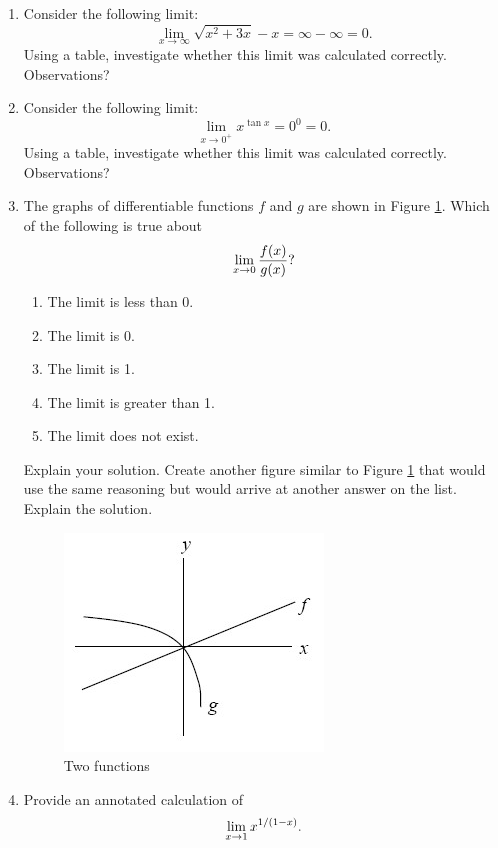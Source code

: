 \begin{enumerate}
\item  Consider the following limit:  $$\mathop {\lim }\limits_{x \to \infty } \sqrt {x^2  + 3x}  - x = \infty  - \infty  = 0.$$  Using a table, investigate whether this limit was calculated correctly.  Observations?

\item  Consider the following limit:  $$\mathop {\lim }\limits_{x \to 0^ +  } x^{\tan x}  = 0^0  = 0.$$  Using a table, investigate whether this limit was calculated correctly.  Observations?

\item  The graphs of differentiable functions $f$ and $g$ are shown in Figure \ref{Chapter4Figurec}.  Which of the following is true about $$\mathop {\lim }\limits_{x \to 0} {{f(x)} \over {g(x)}}?$$ \begin{enumerate}\item The limit is less than 0.  \item   The limit is 0.  
\item The limit is 1. \item The limit is greater than 1.  \item The limit does not exist. \end{enumerate}
Explain your solution.  Create another figure similar to Figure \ref{Chapter4Figurec} that would use the same reasoning but would arrive at another answer on the list.  Explain the solution.

\begin{figure}[ht]
	\centering
		\includegraphics{TeXGraphics/Chapter4Figc.jpg}
	\caption{Two functions}
	\label{Chapter4Figurec}
\end{figure}

\item Provide an annotated calculation of $$
\mathop {\lim }\limits_{x \to 1} x^{{1 \mathord{\left/
 {\vphantom {1 {(1 - x)}}} \right.
 \kern-\nulldelimiterspace} {(1 - x)}}} .
$$


\end{enumerate}


